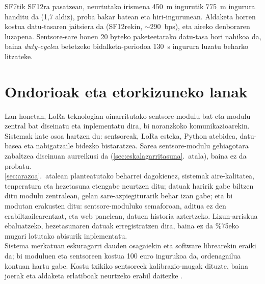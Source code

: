 \documentclass[10pt]{article}
\begin{document}
SF7tik SF12ra pasatzean, neurtutako irismena 450~m ingurutik 775~m ingurura handitu da (1,7 aldiz), proba bakar batean eta hiri-ingurunean. Aldaketa horren kostua datu-tasaren jaitsiera da (SF12rekin, $\sim$290~bps), eta aireko denboraren luzapena. Sentsore-sare honen 20 byteko paketeetarako datu-tasa hori nahikoa da, baina \textit{duty-cycle}a betetzeko bidalketa-periodoa 130~s ingurura luzatu beharko litzateke.




\clearpage
\section{Ondorioak eta etorkizuneko lanak}

Lan honetan, \ac{LoRa} teknologian oinarritutako sentsore-modulu bat eta modulu zentral bat diseinatu eta inplementatu dira, bi noranzkoko komunikazioarekin. Sistemak kate osoa hartzen du: sentsoreak, \ac{LoRa} esteka, Python atebidea, datu-basea eta nabigatzaile bidezko bistaratzea. Sarea sentsore-modulu gehiagotara zabaltzea diseinuan aurreikusi da (\ref{sec:eskalagarritasuna}.~atala), baina ez da probatu.\\

\ref{sec:arazoa}.~atalean planteatutako beharrei dagokienez, sistemak aire-kalitatea, tenperatura eta hezetasuna etengabe neurtzen ditu; datuak haririk gabe biltzen ditu modulu zentralean, gelan sare-azpiegiturarik behar izan gabe; eta bi modutan erakusten ditu: sentsore-moduluko semaforoan, aditua ez den erabiltzailearentzat, eta web panelean, datuen historia aztertzeko. Lizun-arriskua ebaluatzeko, hezetasunaren datuak erregistratzen dira, baina ez da \%75eko mugari lotutako abisurik inplementatu.\\

Sistema merkatuan eskuragarri dauden osagaiekin eta software librearekin eraiki da; bi moduluen eta sentsoreen kostua 100 euro ingurukoa da, ordenagailua kontuan hartu gabe. Kostu txikiko sentsoreek kalibrazio-mugak dituzte, baina joerak eta aldaketa erlatiboak neurtzeko erabil daitezke \cite{karagulian2019,kumar2019low}.\\
\end{document}
